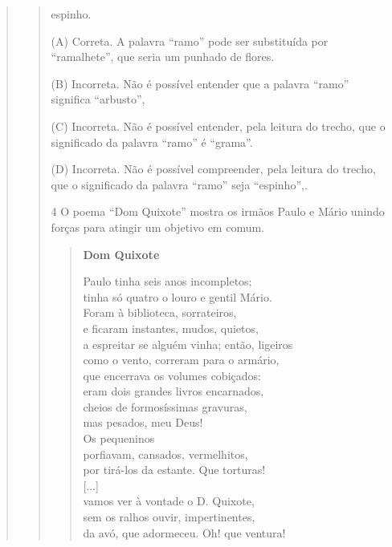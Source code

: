 \begin{escolha}
\begin{quote}
\begin{quote}
\begin{escolha}
\item espinho.
\end{escolha}


(A) Correta. A palavra ``ramo'' pode ser substituída por ``ramalhete'',
que seria um punhado de flores.

(B) Incorreta. Não é possível entender que a palavra ``ramo'' significa
``arbusto'',

(C) Incorreta. Não é possível entender, pela leitura do trecho, que o
significado da palavra ``ramo'' é ``grama''.

(D) Incorreta. Não é possível compreender, pela leitura do trecho, que o
significado da palavra ``ramo'' seja ``espinho'',.

\num{4} O poema ``Dom Quixote'' mostra os irmãos Paulo e Mário unindo forças
para atingir um objetivo em comum.

\begin{verse}
\textbf{Dom Quixote}

Paulo tinha seis anos incompletos;\\
tinha só quatro o louro e gentil Mário.\\
Foram à biblioteca, sorrateiros,\\
e ficaram instantes, mudos, quietos,\\
a espreitar se alguém vinha; então, ligeiros\\
como o vento, correram para o armário,\\
que encerrava os volumes cobiçados:\\
eram dois grandes livros encarnados,\\
cheios de formosíssimas gravuras,\\
mas pesados, meu Deus!\\
Os pequeninos\\
porfiavam, cansados, vermelhitos,\\
por tirá-los da estante. Que torturas!\\
{[}...{]}\\
vamos ver à vontade o D. Quixote,\\
sem os ralhos ouvir, impertinentes,\\
da avó, que adormeceu. Oh! que ventura!
\end{verse}


\end{quote}
\end{quote}
\end{escolha}
